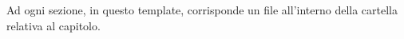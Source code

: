 Ad ogni sezione, in questo template, corrisponde un file all'interno della cartella relativa al capitolo.